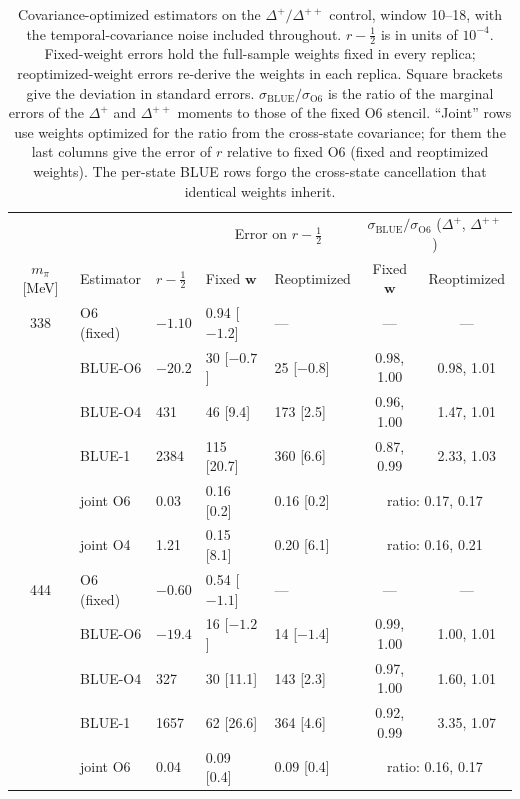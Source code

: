 \documentclass[aps,prd,preprint,nofootinbib,floatfix]{revtex4-2}
\begin{document}
\begin{table}[t]
\caption{Covariance-optimized estimators on the $\Delta^+/\Delta^{++}$ control, window 10--18, with the temporal-covariance noise included throughout. $r-\tfrac12$ is in units of $10^{-4}$. Fixed-weight errors hold the full-sample weights fixed in every replica; reoptimized-weight errors re-derive the weights in each replica. Square brackets give the deviation in standard errors. $\sigma_\mathrm{BLUE}/\sigma_\mathrm{O6}$ is the ratio of the marginal errors of the $\Delta^+$ and $\Delta^{++}$ moments to those of the fixed O6 stencil. ``Joint'' rows use weights optimized for the ratio from the cross-state covariance; for them the last columns give the error of $r$ relative to fixed O6 (fixed and reoptimized weights). The per-state BLUE rows forgo the cross-state cancellation that identical weights inherit.}
\label{tab:decupletblue}
\centering
\setlength{\tabcolsep}{6pt}\begin{tabular}{cllllcc}
\toprule
& & & \multicolumn{2}{c}{Error on $r-\tfrac12$} & \multicolumn{2}{c}{$\sigma_\mathrm{BLUE}/\sigma_\mathrm{O6}$ ($\Delta^+$, $\Delta^{++}$)}\\
$m_\pi$ [MeV] & Estimator & $r-\tfrac12$ & Fixed $\bm w$ & Reoptimized & Fixed $\bm w$ & Reoptimized\\
\midrule
338 & O6 (fixed) & $-1.10$ & 0.94 [$-1.2$] & --- & --- & ---\\
    & BLUE-O6 & $-20.2$ & 30 [$-0.7$] & 25 [$-0.8$] & 0.98, 1.00 & 0.98, 1.01\\
    & BLUE-O4 & 431 & 46 [9.4] & 173 [2.5] & 0.96, 1.00 & 1.47, 1.01\\
    & BLUE-1 & 2384 & 115 [20.7] & 360 [6.6] & 0.87, 0.99 & 2.33, 1.03\\
    & joint O6 & 0.03 & 0.16 [0.2] & 0.16 [0.2] & \multicolumn{2}{c}{ratio: 0.17, 0.17}\\
    & joint O4 & 1.21 & 0.15 [8.1] & 0.20 [6.1] & \multicolumn{2}{c}{ratio: 0.16, 0.21}\\
\midrule
444 & O6 (fixed) & $-0.60$ & 0.54 [$-1.1$] & --- & --- & ---\\
    & BLUE-O6 & $-19.4$ & 16 [$-1.2$] & 14 [$-1.4$] & 0.99, 1.00 & 1.00, 1.01\\
    & BLUE-O4 & 327 & 30 [11.1] & 143 [2.3] & 0.97, 1.00 & 1.60, 1.01\\
    & BLUE-1 & 1657 & 62 [26.6] & 364 [4.6] & 0.92, 0.99 & 3.35, 1.07\\
    & joint O6 & 0.04 & 0.09 [0.4] & 0.09 [0.4] & \multicolumn{2}{c}{ratio: 0.16, 0.17}\\

\end{tabular}
\end{table}
\end{document}
